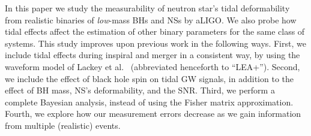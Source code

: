 \documentclass[aps,prd,amsmath,floats,floatfix, twocolumn,
superscriptaddress,nofootinbib,showpacs]{revtex4-1}
\newcommand{\lambdans}{\Lambda_\mathrm{NS}}
\begin{document}


In this paper we study the measurability of neutron star's tidal deformability
from realistic binaries of {\it low}-mass BHs and NSs by aLIGO. We also probe
how tidal effects affect the estimation of other binary parameters for the same
class of systems. This study improves upon previous work in the following ways.
% 
First, we include tidal effects during inspiral and merger in a consistent
way, by using the waveform model of Lackey et al.~\cite{Lackey:2013axa}
(abbreviated henceforth to ``LEA+'').
% 
Second, we include the effect of black hole spin on tidal GW signals, in
addition to the effect of BH mass, NS's deformability, and the SNR.
% 
Third, we perform a complete Bayesian analysis, instead of using the Fisher matrix
approximation.
% 
Fourth, we explore how our measurement errors decrease as we gain information
from multiple (realistic) events.
\end{document}
